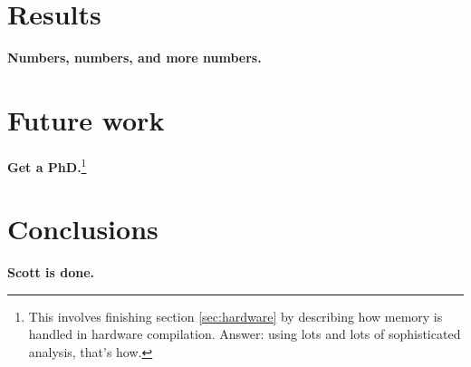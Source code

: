 \documentclass[12pt,titlepage,twoside]{article}
\let\oldsection\section
\renewcommand{\section}{\setcounter{figure}{0}\setcounter{table}{0}\oldsection}
\begin{document}
\section{Results}
\textbf{Numbers, numbers, and more numbers.}

\section{Future work}
\textbf{Get a PhD.}\footnote{This involves finishing section
\ref{sec:hardware} by describing how memory is handled in hardware
compilation.  Answer: using lots and lots of sophisticated analysis,
that's how.}

\section{Conclusions}
\textbf{Scott is done.}
\end{document}
